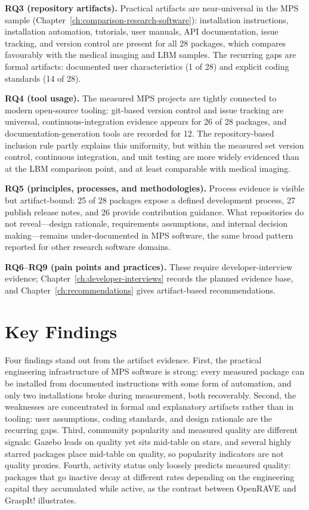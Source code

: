 \textbf{RQ3 (repository artifacts).} Practical artifacts are near-universal in the MPS sample
(Chapter~\ref{ch:comparison-research-software}):
installation instructions, installation automation, tutorials, user manuals,
API documentation, issue tracking, and version control are present for all 28
packages, which compares favourably with the medical imaging and LBM samples.
The recurring gaps are formal artifacts: documented user characteristics (1 of
28) and explicit coding standards (14 of 28).

\textbf{RQ4 (tool usage).} The measured MPS projects are tightly connected to
modern open-source tooling: git-based version control and issue tracking are
universal, continuous-integration evidence appears for 26 of 28 packages, and
documentation-generation tools are recorded for 12. The repository-based
inclusion rule partly explains this uniformity, but within the measured set
version control, continuous integration, and unit testing are more widely
evidenced than at the LBM comparison point, and at least comparable with medical
imaging.

\textbf{RQ5 (principles, processes, and methodologies).} Process evidence is
visible but artifact-bound: 25 of 28 packages expose a defined development
process, 27 publish release notes, and 26 provide contribution guidance. What
repositories do not reveal---design rationale, requirements assumptions, and
internal decision making---remains under-documented in MPS software, the same
broad pattern reported for other research software domains.

\textbf{RQ6--RQ9 (pain points and practices).} These require
developer-interview evidence; Chapter~\ref{ch:developer-interviews}
records the planned evidence base, and
Chapter~\ref{ch:recommendations} gives artifact-based recommendations.

\section{Key Findings}
\label{sec:key-findings}

Four findings stand out from the artifact evidence. First, the practical
engineering infrastructure of MPS software is strong: every measured package
can be installed from documented instructions with some form of automation, and
only two installations broke during measurement, both recoverably. Second, the
weaknesses are concentrated in formal and explanatory artifacts rather than in
tooling: user assumptions, coding standards, and design rationale are the
recurring gaps. Third, community popularity and measured quality are different
signals: Gazebo leads on quality yet sits mid-table on stars,
and several highly starred packages place mid-table on quality,
so popularity indicators are not quality proxies. Fourth,
activity status only loosely predicts measured quality: packages that go
inactive decay at different rates depending on the engineering capital they
accumulated while active, as the contrast between OpenRAVE and GraspIt!
illustrates.


